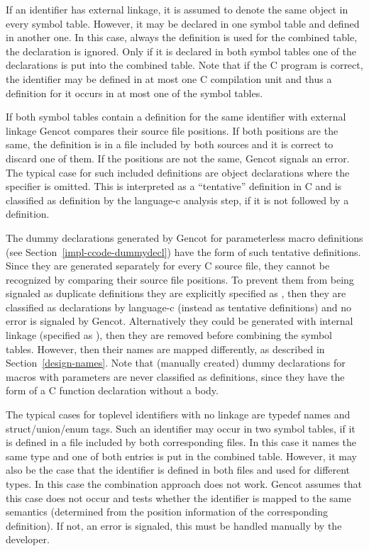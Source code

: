 If an identifier has external linkage, it is assumed to denote the same object in every symbol table. However, it may be
declared in one symbol table and defined in another one. In this case, always the definition is used for the combined
table, the declaration is ignored. Only if it is declared in both symbol tables one of the declarations is put into the
combined table. Note that if the C program is correct, the identifier may be defined in at most one C compilation unit
and thus a definition for it occurs in at most one of the symbol tables. 

If both symbol tables contain a definition for the same identifier with external linkage Gencot compares their source 
file positions. If both positions are the same, the definition is in a file included by both sources and it is correct to
discard one of them. If the positions are not the same, Gencot signals an error. The typical case for such included 
definitions are object declarations where the  specifier is omitted. This is interpreted as a ``tentative''
definition in C and is classified as definition by the language-c analysis step, if it is not followed by a definition.

The dummy declarations generated by Gencot for parameterless macro definitions (see Section~\ref{impl-ccode-dummydecl})
have the form of such tentative definitions. Since they are generated separately for every C source file, they cannot
be recognized by comparing their source file positions. To prevent them from being signaled as duplicate definitions they
are explicitly specified as , then they are classified as declarations by language-c (instead as tentative 
definitions) and no error is signaled by Gencot. Alternatively they could be generated with internal linkage (specified 
as ), then they are removed before combining the symbol tables. However, then their names are mapped differently,
as described in Section~\ref{design-names}. Note that (manually created) dummy declarations for
macros with parameters are never classified as definitions, since they have the form of a C function declaration without
a body. 

The typical cases for toplevel identifiers with no linkage are typedef names and struct/union/enum tags. Such an identifier
may occur in two symbol tables, if it is
defined in a file included by both corresponding  files. In this case it names the same type and one of both
entries is put in the combined table. However, it may also be the case that the identifier is defined in both 
files and used for different types. In this case the combination approach does not work. Gencot assumes that this case
does not occur and tests whether the identifier is mapped to the same semantics (determined from the position information
of the corresponding definition). If not, an error is signaled, this must be handled manually by the developer.

